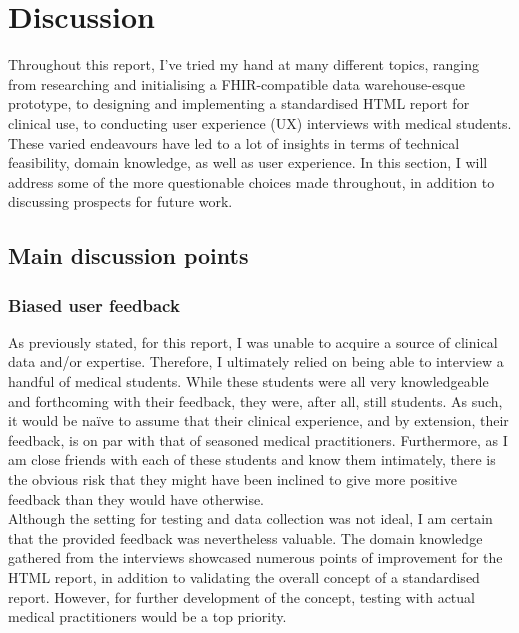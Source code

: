 \section{Discussion}
Throughout this report, I've tried my hand at many different topics, ranging from researching and initialising a FHIR-compatible data warehouse-esque prototype, to designing and implementing a standardised HTML report for clinical use, to conducting user experience (UX) interviews with medical students. These varied endeavours have led to a lot of insights in terms of technical feasibility, domain knowledge, as well as user experience. In this section, I will address some of the more questionable choices made throughout, in addition to discussing prospects for future work.

\subsection{Main discussion points}
\subsubsection*{Biased user feedback}
As previously stated, for this report, I was unable to acquire a source of clinical data and/or expertise. Therefore, I ultimately relied on being able to interview a handful of medical students. While these students were all very knowledgeable and forthcoming with their feedback, they were, after all, still students. As such, it would be na\"ive to assume that their clinical experience, and by extension, their feedback, is on par with that of seasoned medical practitioners. Furthermore, as I am close friends with each of these students and know them intimately, there is the obvious risk that they might have been inclined to give more positive feedback than they would have otherwise.
\\
Although the setting for testing and data collection was not ideal, I am certain that the provided feedback was nevertheless valuable. The domain knowledge gathered from the interviews showcased numerous points of improvement for the HTML report, in addition to validating the overall concept of a standardised report. However, for further development of the concept, testing with actual medical practitioners would be a top priority.

